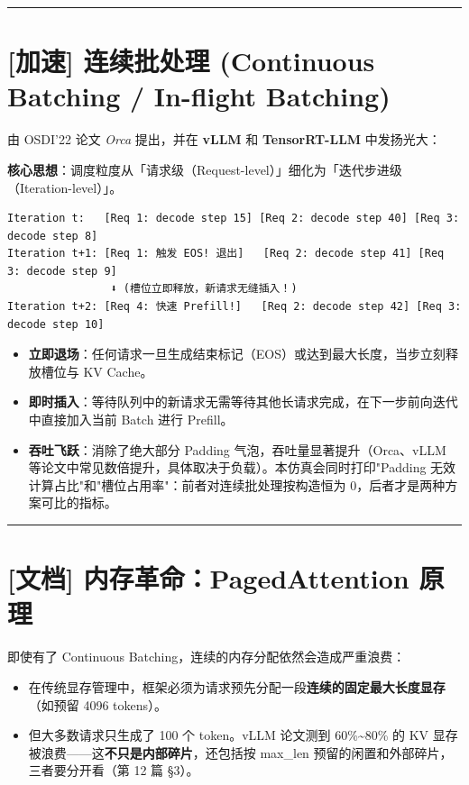 \vspace{0.8em}\hrule\vspace{0.8em}

\section{[加速] 连续批处理 (Continuous Batching / In-flight Batching)}

由 OSDI'22 论文 \textit{Orca} 提出，并在 \textbf{vLLM} 和 \textbf{TensorRT-LLM} 中发扬光大：

\begin{noteBox}[核心导读与背景]
\textbf{核心思想}：调度粒度从「请求级（Request-level）」细化为「迭代步进级（Iteration-level）」。
\end{noteBox}

\begin{lstlisting}[numbers=none]
Iteration t:   [Req 1: decode step 15] [Req 2: decode step 40] [Req 3: decode step 8]
Iteration t+1: [Req 1: 触发 EOS! 退出]   [Req 2: decode step 41] [Req 3: decode step 9]
                ⬇ (槽位立即释放，新请求无缝插入！)
Iteration t+2: [Req 4: 快速 Prefill!]   [Req 2: decode step 42] [Req 3: decode step 10]
\end{lstlisting}

\begin{itemize}
  \item \textbf{立即退场}：任何请求一旦生成结束标记（EOS）或达到最大长度，当步立刻释放槽位与 KV Cache。
  \item \textbf{即时插入}：等待队列中的新请求无需等待其他长请求完成，在下一步前向迭代中直接加入当前 Batch 进行 Prefill。
  \item \textbf{吞吐飞跃}：消除了绝大部分 Padding 气泡，吞吐量显著提升（Orca、vLLM 等论文中常见数倍提升，具体取决于负载）。本仿真会同时打印"Padding 无效计算占比"和"槽位占用率"：前者对连续批处理按构造恒为 0，后者才是两种方案可比的指标。
\end{itemize}

\vspace{0.8em}\hrule\vspace{0.8em}

\section{[文档] 内存革命：PagedAttention 原理}

即使有了 Continuous Batching，连续的内存分配依然会造成严重浪费：
\begin{itemize}
  \item 在传统显存管理中，框架必须为请求预先分配一段\textbf{连续的固定最大长度显存}（如预留 4096 tokens）。
  \item 但大多数请求只生成了 100 个 token。vLLM 论文测到 60\%\textasciitilde{}80\% 的 KV 显存被浪费——这\textbf{不只是内部碎片}，还包括按 max\_len 预留的闲置和外部碎片，三者要分开看（第 12 篇 §3）。
\end{itemize}

